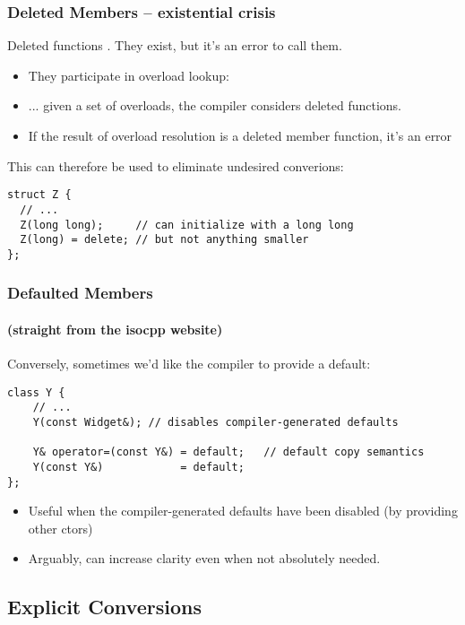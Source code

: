 \begin{frame}[fragile]
\frametitle{Deleted Members -- existential crisis}
Deleted functions .  They exist, but it's
an error to call them.
\begin{itemize}
\item They participate in overload lookup:
\pause{}
\item ... given a set of overloads, the compiler considers deleted
  functions.
\item If the result of overload resolution is a deleted member
  function, it's an error
\pause{}
\end{itemize}

\pause{}
\vskip 12pt
This can therefore be used to eliminate undesired converions:
{\scriptsize
\begin{verbatim}
struct Z {
  // ...
  Z(long long);     // can initialize with a long long
  Z(long) = delete; // but not anything smaller
};
\end{verbatim}
}




\end{frame}


\begin{frame}[fragile]
\frametitle{Defaulted Members}
\framesubtitle{(straight from the isocpp website)}
Conversely, sometimes we'd like the compiler to provide a default:
{\scriptsize
\begin{verbatim}
class Y {
    // ...
    Y(const Widget&); // disables compiler-generated defaults

    Y& operator=(const Y&) = default;   // default copy semantics
    Y(const Y&)            = default;
};
\end{verbatim}
}
\pause{}
\begin{itemize}
\item Useful when the compiler-generated defaults have been disabled (by
providing other ctors)
\item Arguably, can increase clarity even when not absolutely needed.
\end{itemize}
\end{frame}


\subsection{Explicit Conversions}


